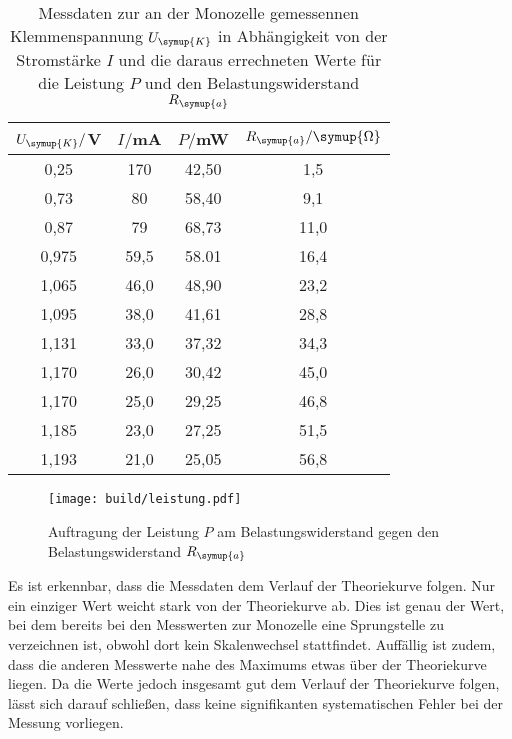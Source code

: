\begin{table}
  \centering
  \caption{Messdaten zur an der Monozelle gemessennen Klemmenspannung $U_{\symup{K}}$
  in Abhängigkeit von der Stromstärke $I$ und die daraus errechneten Werte für
  die Leistung $P$ und den Belastungswiderstand $R_{\symup{a}}$}
  \label{tab:leistung}
  \begin{tabular}{c c c c}
    \toprule
    $U_{\symup{K}}/$V & $I/$mA & $P/$mW & $R_{\symup{a}}/\symup{\Omega}$\\
    \midrule
    0,25	&  170 &   42,50  &  1,5\\
    0,73	&  80  &   58,40  &  9,1\\
    0,87	&  79  &   68,73  &  11,0\\
    0,975	& 59,5 &   58.01  &  16,4\\
    1,065	& 46,0 &   48,90  &  23,2\\
    1,095	& 38,0 &   41,61  &  28,8\\
    1,131	& 33,0 &   37,32  &  34,3\\
    1,170	& 26,0 &   30,42  &  45,0\\
    1,170	& 25,0 &   29,25  &  46,8\\
    1,185	& 23,0 &   27,25  &  51,5\\
    1,193	& 21,0 &   25,05  &  56,8\\
    \bottomrule
  \end{tabular}
\end{table}

\begin{figure}
  \centering
  \texttt{[image: build/leistung.pdf]}
  \caption{Auftragung der Leistung $P$ am Belastungswiderstand gegen den Belastungswiderstand
  $R_{\symup{a}}$}
  \label{fig:leistung}
\end{figure}

Es ist erkennbar, dass die Messdaten dem Verlauf der Theoriekurve folgen.
Nur ein einziger Wert weicht stark von der Theoriekurve ab. Dies ist genau der
Wert, bei dem bereits bei den Messwerten zur Monozelle eine Sprungstelle zu verzeichnen
ist, obwohl dort kein Skalenwechsel stattfindet. Auffällig ist zudem, dass die anderen
Messwerte nahe des Maximums etwas über der Theoriekurve liegen.
Da die Werte jedoch insgesamt gut dem Verlauf der Theoriekurve folgen, lässt
sich darauf schließen, dass keine signifikanten systematischen Fehler bei der
Messung vorliegen.
